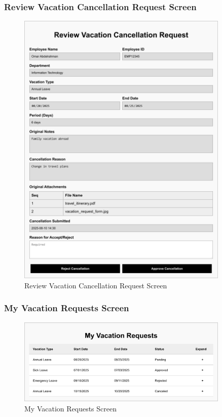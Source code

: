 \documentclass[12pt,a4paper]{article}
\begin{document}
\subsubsection{Review Vacation Cancellation Request Screen}
\begin{figure}[H]
\centering
\includegraphics[width=0.9\textwidth]{Wireframes/Review-Vacation-Cancellation-Request/Review-Vacation-Cancellation-Request-1.png}
\caption{Review Vacation Cancellation Request Screen}
\label{fig:review-cancellation-screen}
\end{figure}

\subsubsection{My Vacation Requests Screen}
\begin{figure}[H]
\centering
\includegraphics[width=0.9\textwidth]{Wireframes/My-Vacation-Requests/My-Vacation-Requests-1.png}
\caption{My Vacation Requests Screen}
\label{fig:my-vacation-requests-screen}
\end{figure}
\end{document}
